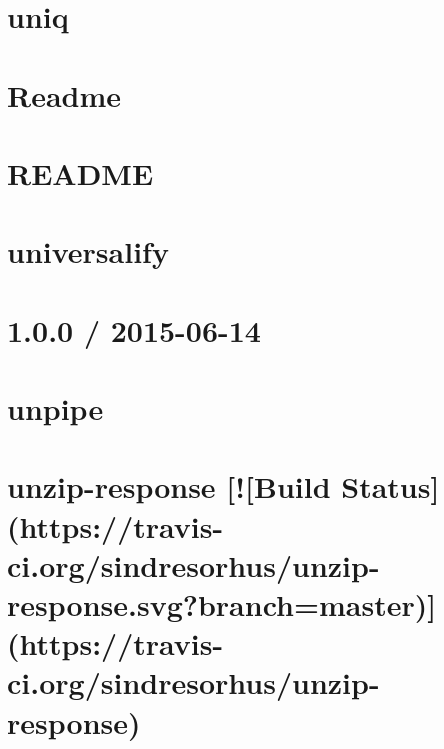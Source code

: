 \documentclass[twoside]{book}
\newcommand{\+}{\discretionary{\mbox{\scriptsize$\hookleftarrow$}}{}{}}
\begin{document}
\chapter{uniq}
\label{md__c_1_workspace_demo_src_main_script_node_modules_uniq__r_e_a_d_m_e}

\chapter{Readme}
\label{md__c_1_workspace_demo_src_main_script_node_modules_uniqid__readme}

\chapter{R\+E\+A\+D\+ME}
\label{md__c_1_workspace_demo_src_main_script_node_modules_uniqs__r_e_a_d_m_e}

\chapter{universalify}
\label{md__c_1_workspace_demo_src_main_script_node_modules_universalify__r_e_a_d_m_e}

\chapter{1.0.0 / 2015-\/06-\/14}
\label{md__c_1_workspace_demo_src_main_script_node_modules_unpipe__h_i_s_t_o_r_y}

\chapter{unpipe}
\label{md__c_1_workspace_demo_src_main_script_node_modules_unpipe__r_e_a_d_m_e}

\chapter{unzip-\/response \mbox{[}!\mbox{[}Build Status\mbox{]}(https\+://travis-\/ci.org/sindresorhus/unzip-\/response.svg?branch=master)\mbox{]}(https\+://travis-\/ci.org/sindresorhus/unzip-\/response)}
\label{md__c_1_workspace_demo_src_main_script_node_modules_unzip-response_readme}

\end{document}
